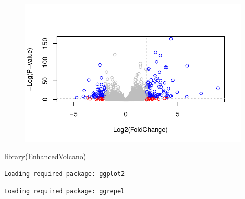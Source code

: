 \documentclass[
  letterpaper,
  DIV=11,
  numbers=noendperiod]{scrartcl}
\newenvironment{Shaded}{\begin{snugshade}}{\end{snugshade}}
\newcommand{\AttributeTok}[1]{\textcolor[rgb]{0.40,0.45,0.13}{#1}}
\newcommand{\FunctionTok}[1]{\textcolor[rgb]{0.28,0.35,0.67}{#1}}
\newcommand{\NormalTok}[1]{\textcolor[rgb]{0.00,0.23,0.31}{#1}}
\newcommand{\OtherTok}[1]{\textcolor[rgb]{0.00,0.23,0.31}{#1}}
\newcommand{\SpecialCharTok}[1]{\textcolor[rgb]{0.37,0.37,0.37}{#1}}
\newcommand{\StringTok}[1]{\textcolor[rgb]{0.13,0.47,0.30}{#1}}
\begin{document}
\begin{figure}[H]

{\centering \includegraphics{Class12_files/figure-pdf/unnamed-chunk-27-1.pdf}

}

\end{figure}

\begin{Shaded}
\begin{Highlighting}[]
\FunctionTok{library}\NormalTok{(EnhancedVolcano)}
\end{Highlighting}
\end{Shaded}

\begin{verbatim}
Loading required package: ggplot2
\end{verbatim}

\begin{verbatim}
Loading required package: ggrepel
\end{verbatim}

\begin{Shaded}
\end{Shaded}
\end{document}
